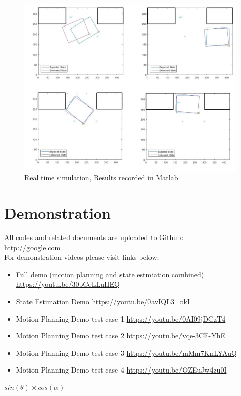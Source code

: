 \documentclass[12pt, letterpaper]{amsart} %
\numberwithin{equation}{section}
\begin{document}
\begin{figure}[h!]
\includegraphics[width=110mm]{fig_19.png}
\caption{Real time simulation, Results recorded in Matlab}
\label{fig:figure19}	
\end{figure}
\newpage

\section{Demonstration}
All codes and related documents are uploaded to Github: 
\\
\url{http://google.com}
\\For demonstration videos please visit links below:
\begin{itemize}
\item Full demo (motion planning and state estmiation combined) \\
\url{https://youtu.be/30bCeLLuHEQ}
\item State Estimation Demo 
\url{https://youtu.be/0avIQL3_okI}
\item Motion Planning Demo test case 1
\url{https://youtu.be/0AI09jDCzT4}
\item Motion Planning Demo test case 2 
\url{https://youtu.be/vqe-3CE-YhE}
\item Motion Planning Demo test case 3 
\url{https://youtu.be/mMm7KnLYAuQ}
\item Motion Planning Demo test case 4 
\url{https://youtu.be/OZEuJw4zu0I}
\end{itemize}


 $sin(\theta) \times cos(\alpha)$
\end{document}
